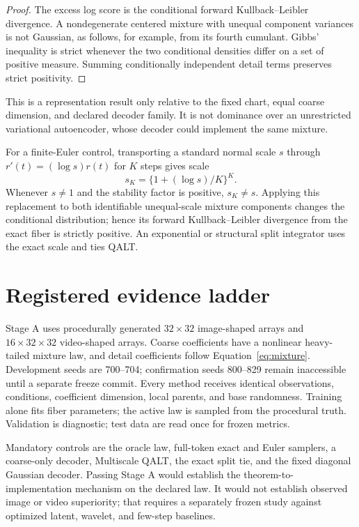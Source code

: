 \documentclass[11pt]{article}
\begin{document}
\begin{proof}
The excess log score is the conditional forward Kullback--Leibler divergence.  A nondegenerate centered mixture with unequal component variances is not Gaussian, as follows, for example, from its fourth cumulant.  Gibbs' inequality is strict whenever the two conditional densities differ on a set of positive measure.  Summing conditionally independent detail terms preserves strict positivity.
\end{proof}

This is a representation result only relative to the fixed chart, equal coarse dimension, and declared decoder family.  It is not dominance over an unrestricted variational autoencoder, whose decoder could implement the same mixture.

For a finite-Euler control, transporting a standard normal scale $s$ through $r'(t)=(\log s)r(t)$ for $K$ steps gives scale
\begin{equation}
s_K=\{1+(\log s)/K\}^{K}.
\end{equation}
Whenever $s\ne1$ and the stability factor is positive, $s_K\ne s$.  Applying this replacement to both identifiable unequal-scale mixture components changes the conditional distribution; hence its forward Kullback--Leibler divergence from the exact fiber is strictly positive.  An exponential or structural split integrator uses the exact scale and ties QALT.

\section{Registered evidence ladder}

Stage A uses procedurally generated $32\times32$ image-shaped arrays and $16\times32\times32$ video-shaped arrays.  Coarse coefficients have a nonlinear heavy-tailed mixture law, and detail coefficients follow Equation~\eqref{eq:mixture}.  Development seeds are 700--704; confirmation seeds 800--829 remain inaccessible until a separate freeze commit.  Every method receives identical observations, conditions, coefficient dimension, local parents, and base randomness.  Training alone fits fiber parameters; the active law is sampled from the procedural truth.  Validation is diagnostic; test data are read once for frozen metrics.

Mandatory controls are the oracle law, full-token exact and Euler samplers, a coarse-only decoder, Multiscale QALT, the exact split tie, and the fixed diagonal Gaussian decoder.  Passing Stage A would establish the theorem-to-implementation mechanism on the declared law.  It would not establish observed image or video superiority; that requires a separately frozen study against optimized latent, wavelet, and few-step baselines.
\end{document}
